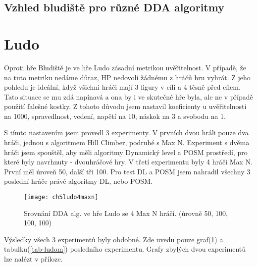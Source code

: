\subsection{Vzhled bludiště pro různé DDA algoritmy}

\section{Ludo}

Oproti hře Bludiště je ve hře Ludo zásadní metrikou uvěřitelnost. V případě, že na tuto metriku nedáme důraz, HP nedovolí žádnému z hráčů hru vyhrát. Z jeho pohledu je ideální, když všichni hráči mají 3 figury v cíli a 4 těsně před cílem. Tato situace se mu zdá napínavá a ona by i ve skutečné hře byla, ale ne v případě použití falešné kostky. Z tohoto důvodu jsem nastavil koeficienty u uvěřitelnosti na 1000, spravedlnost, vedení, napětí na 10, náskok na 3 a svobodu na 1.

S tímto nastavením jsem provedl 3 experimenty. V prvních dvou hráli pouze dva hráči, jednou s algoritmem Hill Climber, podruhé s Max N. Experiment s dvěma hráči jsem spouštěl, aby měli algoritmy Dynamický level a POSM prostředí, pro které byly navrhnuty - dvouhráčové hry. V třetí experimentu byly 4 hráči Max N. První měl úroveň 50, další tři 100. Pro test DL a POSM jsem nahradil všechny 3 poslední hráče právě algoritmy DL, nebo POSM.

\begin{figure}
  \centering
  \texttt{[image: ch5ludo4maxn]}
	\caption{Srovnání DDA alg. ve hře Ludo se 4 Max N hráči. (úrovně 50, 100, 100, 100)}
	\label{fig-ch5ludo4maxn}
\end{figure}

Výsledky všech 3 experimentů byly obdobné. Zde uvedu pouze graf(\ref{fig-ch5ludo4maxn}) a tabulku(\ref{tab-ludom}) posledního experimentu. Grafy zbylých dvou experimentů lze nalézt v příloze.

